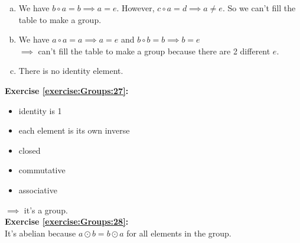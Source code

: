 %
%
\begin{enumerate}[(a)]
\item
We have $b\circ a=b\implies a=e$. However, $c\circ a=d\implies a\neq e$.
So we can't fill the table to make a group.

\item
 We have $a\circ a=a\implies a=e$ and $b\circ b=b\implies b=e$\\
$\implies$  can't fill the table to make a group because there are 2 different $e$.

\item
There is no identity element.
\end{enumerate}

\noindent\textbf{Exercise \ref{exercise:Groups:27}:}
\begin{itemize}
\item
identity is 1

\item
each element is its own inverse

\item
closed

\item
commutative

\item
associative

\end{itemize}
\noindent
$\implies$  it's a group.
\\

\noindent\textbf{Exercise \ref{exercise:Groups:28}:}
\\
It's abelian because $a\odot b=b\odot a$ for all elements in the group.
\\

